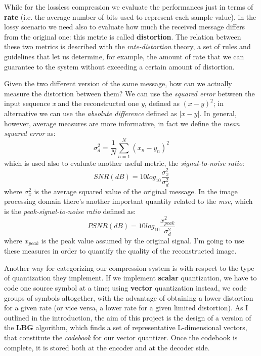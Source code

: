 \documentclass{article}
\begin{document}
While for the lossless compression we evaluate the performances just in terms of \textbf{rate} (i.e. the average number of bits used to represent each sample value), in the lossy scenario we need also to evaluate how much the received message differs from the original one: this metric is called \textbf{distortion}. The relation between these two metrics is described with the \textit{rate-distortion} \cite{rate_dist} theory, a set of rules and guidelines that let us determine, for example, the amount of rate that we can guarantee to the system without exceeding a certain amount of distortion.

Given the two different version of the same message, how can we actually measure the distortion between them? We can use the \textit{squared error} between the input sequence \textit{x} and the reconstructed one \textit{y}, defined as $(x-y)^2$; in alternative we can use the \textit{absolute difference} defined as $|x-y|$. In general, however, average measures are more informative, in fact we define the \textit{mean squared error} as: 
\begin{equation}
\sigma^2_d = \frac{1}{N} \sum_{n = 1}^{N} (x_n - y_n)^2
\end{equation}
which is used also to evaluate another useful metric, the \textit{signal-to-noise ratio}:
\begin{equation}
SNR(dB) = 10log_{10}\frac{\sigma^2_x}{\sigma^2_d}
\end{equation}
where $\sigma^2_x$ is the average squared value of the original message. In the image processing domain there's another important quantity related to the \textit{mse}, which is the \textit{peak-signal-to-noise ratio} defined as: 
\begin{equation}
PSNR(dB) = 10log_{10}\frac{x^2_{peak}}{\sigma^2_d} 
\end{equation}
where $x_{peak}$ is the peak value assumed by the original signal. I'm going to use these measures in order to quantify the quality of the reconstructed image.

Another way for categorizing our compression system is with respect to the type of quantization they implement. If we implement \textbf{scalar} quantization, we have to code one source symbol at a time; using \textbf{vector} quantization instead, we code groups of symbols altogether, with the advantage of obtaining a lower distortion for a given rate (or vice versa, a lower rate for a given limited distortion). As I outlined in the introduction, the aim of this project is the design of a version of the \textbf{LBG} algorithm, which finds a set of representative L-dimensional vectors, that constitute the \textit{codebook} for our vector quantizer. Once the codebook is complete, it is stored both at the encoder and at the decoder side. %
\end{document}
